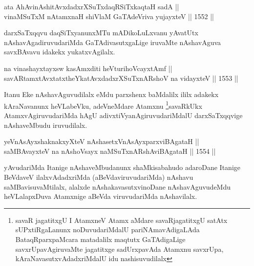 
\begin{shl}
ata AhAvinAshitAvxdadxrXSuTxdaqRSiTxkaqtaH sadA ||  \\
\footnotemark[5]vinaMSuTxM nA\s \s tamxnaH shiVlaM GaTAdeVriva yujayxteV ||  1552 ||  
\end{shl}
\begin{artha}
darxSaTxqqvu daqSiTxyanunxMTu mADikoLuLxvanu yAvatUtx nAshavAgadiruvudariMda GaTAdivasutxgaLige iruvaMte nAshavAguva savxBAvavu idakekx yukatxvAgilalx.
\end{artha}

\begin{shl}
na vinashayxtayxsw kasAmxditi heVturihoVcayxtAmf || \\
\footnotemark[6]savARtamxtAvxtatxtheYkatAvxdadxrXSuTxnARshoV na vidayxteV ||  1553 ||  
\end{shl}

\begin{artha}
Itanu Eke nAshavAguvudilalx eMdu parxshenx baMdalilx ililx adakekx kAraNavanunx heVLabeVku, adeVneMdare Atamxnu \footnote{savaR jagatitxgU I AtamxneV Atamx aMdare savaRjagatitxgU satAtx sUPxtiRgaLanunx noDuvudariMdalU pariNAmavAdigaLAda BataqRparxpaMcara matadalilx maqtutx GaTAdigaLige savxrUpavAgiruvaMte jagatitxge sadUrxpavAda Atamxnu savxrUpa, kAraNavasutxvAdadxriMdalU idu nashisuvudilalx}savaRkUkx AtamxvAgiruvudariMda hAgU adivxtiVyanAgiruvudariMdalU darxSaTxqqvige nAshaveMbudu iruvudilalx.
\end{artha}


\begin{shl}
yeVnAsAyx\s \s shaknakxyXteV nAshasetxVnAsAyxparxviBAgataH || \\
\footnotemark[1]saMBAvayxteV na nAshoV\s sayx naMSuTxnARshAviBAgataH ||  1554 ||  
\end{shl}

\begin{artha}
yAvudariMda Itanige nAshaveMbudanunx shaMkisabahudo adaroDane Itanige BeVdaveV ilalxvAdadxriMda (aBeVdaviruvudariMda) nAshavu saMBavisuvaMtilalx, alalxde nAshakavasutxvinoDane nAshavAguvudeMdu heVLalapxDuva Atamxnige aBeVda viruvudariMda nAshavilalx.
\end{artha}

